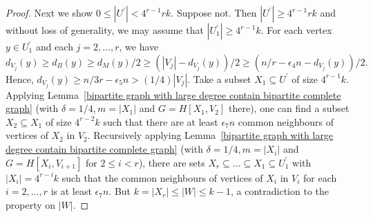 \documentclass[10pt]{article}
\begin{document}
\begin{proof}
Next we show $0\leq|U^\prime|<4^{r-1}rk$.
Suppose not. Then $|U^{\prime}|\geq 4^{r-1}rk$ and without loss of generality, we may assume that $|U^\prime_1|\geq 4^{r-1}k$.
For each vertex $y\in U^\prime_1$ and each $j=2,\ldots,r$, we have
$$d_{V_{j}}(y)\geq d_B(y)\geq d_M(y)/2\geq (|V_j|-d_{V_{j}}(y))/2\geq (n/r-\epsilon_4 n- d_{V_{j}}(y)) /2.$$
Hence, $d_{V_{j}}(y)\geq n/3r-\epsilon_5n>(1/4)|V_j|$.
Take a subset $X_1\subseteq U^\prime$ of size $4^{r-1}k$.
Applying Lemma~\ref{bipartite graph with large degree contain bipartite complete graph} (with $\delta=1/4, m=|X_1|$ and $G=H[X_1,V_2]$ there),
one can find a subset $X_2\subseteq X_1$ of size $4^{r-2}k$ such that there are at least $\epsilon_7n$ common neighbours of vertices of $X_2$ in $V_2$.
Recursively applying Lemma~\ref{bipartite graph with large degree contain bipartite complete graph} (with $\delta=1/4, m=|X_i|$ and $G=H[X_i,V_{i+1}]$ for $2\leq i<r$),
there are sets $X_r\subseteq \ldots \subseteq X_1\subseteq U^\prime_1$ with $|X_i|=4^{r-i}k$ such that the common neighbours of vertices of $X_i$ in $V_i$ for each $i=2,...,r$ is at least $\epsilon_7n$.
But $k=|X_r|\leq |W|\leq k-1$, a contradiction to the property on $|W|$.



\end{proof}
\end{document}
